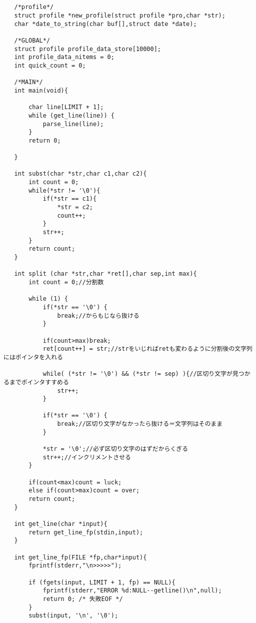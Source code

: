 \documentclass[a4j,11pt]{jarticle}
\begin{document}
\begin{lstlisting}
   
   
   /*profile*/
   struct profile *new_profile(struct profile *pro,char *str);
   char *date_to_string(char buf[],struct date *date);
   
   /*GLOBAL*/
   struct profile profile_data_store[10000];
   int profile_data_nitems = 0;
   int quick_count = 0;
   
   /*MAIN*/
   int main(void){
   
       char line[LIMIT + 1];
       while (get_line(line)) {
           parse_line(line);
       }
       return 0;
   
   }
   
   int subst(char *str,char c1,char c2){
       int count = 0;
       while(*str != '\0'){
           if(*str == c1){
               *str = c2;
               count++;
           }
           str++;
       }
       return count;
   }
   
   int split (char *str,char *ret[],char sep,int max){
       int count = 0;//分割数
   
       while (1) {
           if(*str == '\0') {
               break;//からもじなら抜ける
           }
          
           if(count>max)break;
           ret[count++] = str;//strをいじればretも変わるように分割後の文字列にはポインタを入れる
   
           while( (*str != '\0') && (*str != sep) ){//区切り文字が見つかるまでポインタすすめる 
               str++;
           }
           
           if(*str == '\0') {
               break;//区切り文字がなかったら抜ける＝文字列はそのまま
           }                                                                                                   
   
           *str = '\0';//必ず区切り文字のはずだからくぎる
           str++;//インクリメントさせる  
       }
   
       if(count<max)count = luck;
       else if(count>max)count = over;
       return count;
   }
   
   int get_line(char *input){
       return get_line_fp(stdin,input);
   }
   
   int get_line_fp(FILE *fp,char*input){
       fprintf(stderr,"\n>>>>>");
       
       if (fgets(input, LIMIT + 1, fp) == NULL){
           fprintf(stderr,"ERROR %d:NULL--getline()\n",null);
           return 0; /* 失敗EOF */
       }
       subst(input, '\n', '\0');
       

\end{lstlisting}
\end{document}
